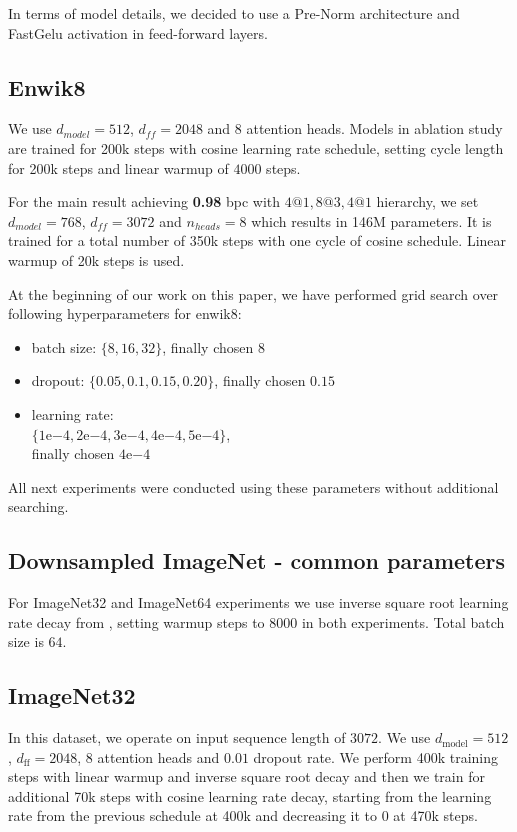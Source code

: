 \documentclass[11pt]{article}
\newcommand{\expnumber}[2]{{#1}\mathrm{e}{#2}}
\begin{document}
In terms of model details, we decided to use a Pre-Norm architecture and FastGelu activation in feed-forward layers. 

\subsection{Enwik8}
We use $d_{model} = 512$, $d_{ff} = 2048$ and 8 attention heads. Models in ablation study are trained for 200k steps with cosine learning rate schedule, setting cycle length for 200k steps and linear warmup of $4000$ steps. 

For the main result achieving \textbf{0.98} bpc with $4@1, 8@3, 4@1$ hierarchy, we set $d_{model} = 768$, $d_{ff} = 3072$ and $n_{heads} = 8$ which results in 146M parameters. It is trained for a total number of 350k steps with one cycle of cosine schedule. Linear warmup of 20k steps is used.

At the beginning of our work on this paper, we have performed grid search over following hyperparameters for enwik8:
\begin{itemize}
    \item batch size: $\{ 8, 16, 32\}$, finally chosen $8$
    \item dropout: $\{ 0.05, 0.1, 0.15, 0.20 \}$, finally chosen $0.15$ 
    \item learning rate:\\ $\{\expnumber{1}{-4}, \expnumber{2}{-4}, \expnumber{3}{-4}, \expnumber{4}{-4}, \expnumber{5}{-4} \}$,\\ finally chosen $\expnumber{4}{-4}$
\end{itemize}
All next experiments were conducted using these parameters without additional searching.

\subsection{Downsampled ImageNet - common parameters}
For ImageNet32 and ImageNet64 experiments we use inverse square root learning rate decay from \cite{vaswani2017attention}, setting warmup steps to $8000$ in both experiments. Total batch size is $64$.

\subsection{ImageNet32}
In this dataset, we operate on input sequence length of $3072$. We use $d_{\mathrm{model}} = 512$, $d_{\mathrm{ff}} = 2048$, $8$ attention heads and $0.01$ dropout rate. We perform 400k training steps with linear warmup and inverse square root decay and then we train for additional 70k steps with cosine learning rate decay, starting from the learning rate from the previous schedule at 400k and decreasing it to $0$ at 470k steps. 
\end{document}
